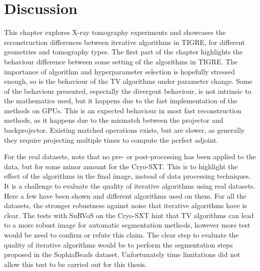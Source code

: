 \section{Discussion}
This chapter explores X-ray tomography experiments and showcases the reconstruction differences between iterative algorithms in TIGRE, for different geometries and tomography types. The first part of the chapter highlights the behaviour difference between some setting of the algorithms in TIGRE. The importance of algorithm and hyperparameter selection is hopefully stressed enough, so is the behaviour of the TV algorithms under parameter change. Some of the behaviour presented, especially the divergent behaviour, is not intrinsic to the mathematics used, but it happens due to the fast implementation of the methods on GPUs. This is an expected behaviour in most fast reconstruction methods, as it happens due to the mismatch between the projector and backprojector. Existing matched operations exists, but are slower, as generally they require projecting multiple times to compute the perfect adjoint. 

For the real datasets, note that no pre- or post-processing has been applied to the data, but for some minor amount for the Cryo-SXT. This is to highlight the effect of the algorithms in the final image, instead of data processing techniques. It is a challenge to evaluate the quality of iterative algorithms using real datasets. Here a few have been shown and different algorithms used on them. For all the datasets, the stronger robustness against noise that iterative algorithms have is clear. The tests with SuRVoS on the Cryo-SXT hint that TV algorithms can lead to a more robust image for automatic segmentation methods, however more test would be need to confirm or refute this claim. The clear step to evaluate the quality of iterative algorithms would be to perform the segmentation steps proposed in the SophiaBeads dataset. Unfortunately time limitations did not allow this test to be carried out for this thesis. 
